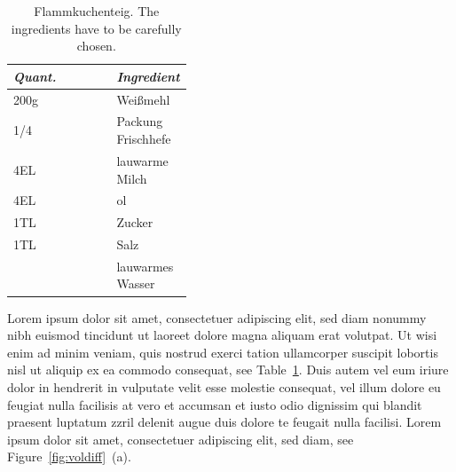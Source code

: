 \begin{table}
    \centering
    \begin{tabular}{|l|p{0.4\linewidth}|}
    \hline
    \emph{Quant.} & \emph{Ingredient}\\
    \hline
		200g &Wei{\ss}mehl\\
		1/4  &Packung Frischhefe\\
		4EL  &lauwarme Milch\\
		4EL  &ol\\
		1TL  &Zucker\\
		1TL  &Salz\\
		&lauwarmes Wasser\\
    \hline
    \end{tabular}
    \caption[Flammkuchenteig]{Flammkuchenteig. The ingredients have to be carefully chosen.\label{tab:mytable}}
\end{table}
%
Lorem ipsum dolor sit amet, consectetuer adipiscing elit, sed diam nonummy nibh euismod tincidunt ut laoreet dolore magna aliquam erat volutpat. Ut wisi enim ad minim veniam, quis nostrud exerci tation ullamcorper suscipit lobortis nisl ut aliquip ex ea commodo consequat, see Table~\ref{tab:mytable}. Duis autem vel eum iriure dolor in hendrerit in vulputate velit esse molestie consequat, vel illum dolore eu feugiat nulla facilisis at vero et accumsan et iusto odio dignissim qui blandit praesent luptatum zzril delenit augue duis dolore te feugait nulla facilisi. Lorem ipsum dolor sit amet, consectetuer adipiscing elit, sed diam,
see Figure~\ref{fig:voldiff}~(a).
%

